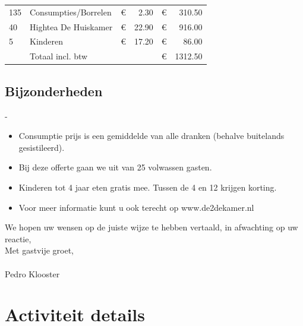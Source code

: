 \documentclass{scrartcl}
\begin{document}
\begin{tabular}{l l l r l r} 
135 & Consumpties/Borrelen & \euro{} & 2.30 & \euro{} & 310.50 \\
40 & Hightea De Huiskamer & \euro{} & 22.90 & \euro{} & 916.00 \\
5 & Kinderen & \euro{} & 17.20 & \euro{} & 86.00 \\
\hline
& Totaal incl. btw & & & \euro{} & 1312.50 \\
\end{tabular} 


\subsection*{Bijzonderheden}

-

\begin{itemize} 
	\item Consumptie prijs is een gemiddelde van alle dranken (behalve buitelands gesistileerd).
 
	\item Bij deze offerte gaan we uit van 25 volwassen gasten.
 
	\item Kinderen tot 4 jaar eten gratis mee. Tussen de 4 en 12 krijgen korting.
 
	\item Voor meer informatie kunt u ook terecht op www.de2dekamer.nl
 
\end{itemize} 


We hopen uw wensen op de juiste wijze te hebben vertaald, in afwachting op uw reactie, \\

Met gastvije groet, \\\\

Pedro Klooster

\newpage

\section{Activiteit details}
\end{document}
